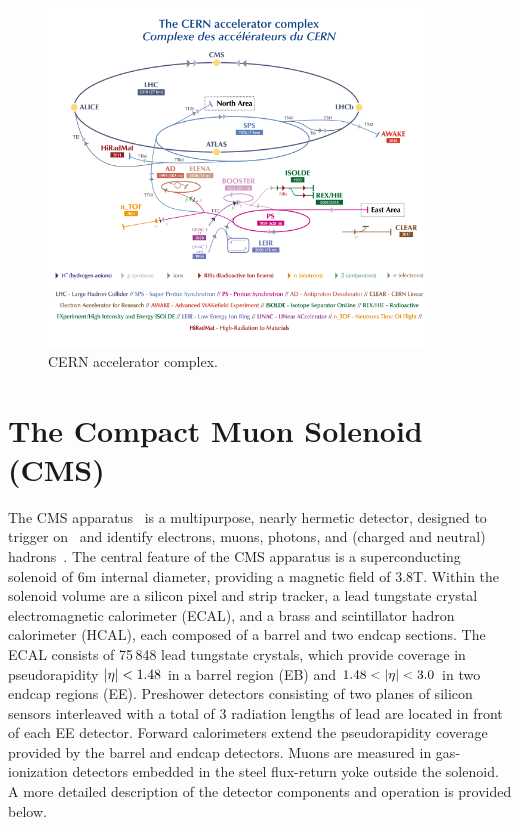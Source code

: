 \begin{figure}
  \centering
   \includegraphics[width=0.9\textwidth]{fig/experiment/CCC-v2019-final-white.png}
	\caption{CERN accelerator complex.}
	\label{fig:accelerator_complex}
\end{figure}


\section{The Compact Muon Solenoid (CMS)}
The CMS apparatus~\cite{CMS:2008xjf} is a multipurpose, nearly hermetic detector, designed to trigger on~\cite{CMS:2020cmk,CMS:2016ngn} and identify electrons, muons, photons, and (charged and neutral) hadrons~\cite{CMS:2015xaf,CMS:2018rym,CMS:2015myp,CMS:2014pgm}.
The central feature of the CMS apparatus is a superconducting solenoid of 6\unit{m} internal diameter, providing a magnetic field of $3.8$\unit{T}. Within the solenoid volume are a silicon pixel and strip tracker, a lead tungstate crystal electromagnetic calorimeter (ECAL), and a brass and scintillator hadron calorimeter (HCAL), each composed of a barrel and two endcap sections. The ECAL consists of 75\,848 lead tungstate crystals, which provide coverage in pseudorapidity $\lvert \eta \rvert < 1.48 $ in a barrel region (EB) and $1.48 < \lvert \eta \rvert < 3.0$ in two endcap regions (EE). Preshower detectors consisting of two planes of silicon sensors interleaved with a total of $3$ radiation lengths of lead are located in front of each EE detector. Forward calorimeters extend the pseudorapidity coverage provided by the barrel and endcap detectors. Muons are measured in gas-ionization detectors embedded in the steel flux-return yoke outside the solenoid. A more detailed description of the detector components and operation is provided below. 

